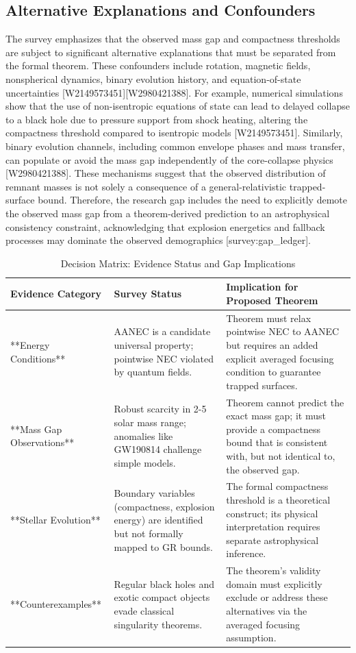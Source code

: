\documentclass[conference]{IEEEtran}
\begin{document}
\subsection{Alternative Explanations and Confounders}
The survey emphasizes that the observed mass gap and compactness thresholds are subject to significant alternative explanations that must be separated from the formal theorem. These confounders include rotation, magnetic fields, nonspherical dynamics, binary evolution history, and equation-of-state uncertainties [W2149573451][W2980421388]. For example, numerical simulations show that the use of non-isentropic equations of state can lead to delayed collapse to a black hole due to pressure support from shock heating, altering the compactness threshold compared to isentropic models [W2149573451]. Similarly, binary evolution channels, including common envelope phases and mass transfer, can populate or avoid the mass gap independently of the core-collapse physics [W2980421388]. These mechanisms suggest that the observed distribution of remnant masses is not solely a consequence of a general-relativistic trapped-surface bound. Therefore, the research gap includes the need to explicitly demote the observed mass gap from a theorem-derived prediction to an astrophysical consistency constraint, acknowledging that explosion energetics and fallback processes may dominate the observed demographics [survey:gap\_ledger].~\cite{cite_7a44e6730c44cb39}

\begin{table}[htbp]
\centering
\footnotesize
\setlength{\tabcolsep}{3pt}
\renewcommand{\arraystretch}{1.12}
\caption{Decision Matrix: Evidence Status and Gap Implications}
\label{tab:survey-and-research-gap-gap-04}
\begin{tabular}{|p{}|p{}|p{}|}
\hline
Evidence Category & Survey Status & Implication for Proposed Theorem \\\hline
**Energy Conditions** & AANEC is a candidate universal property; pointwise NEC violated by quantum fields. & Theorem must relax pointwise NEC to AANEC but requires an added explicit averaged focusing condition to guarantee trapped surfaces. \\\hline
**Mass Gap Observations** & Robust scarcity in 2-5 solar mass range; anomalies like GW190814 challenge simple models. & Theorem cannot predict the exact mass gap; it must provide a compactness bound that is consistent with, but not identical to, the observed gap. \\\hline
**Stellar Evolution** & Boundary variables (compactness, explosion energy) are identified but not formally mapped to GR bounds. & The formal compactness threshold is a theoretical construct; its physical interpretation requires separate astrophysical inference. \\\hline
**Counterexamples** & Regular black holes and exotic compact objects evade classical singularity theorems. & The theorem's validity domain must explicitly exclude or address these alternatives via the averaged focusing assumption. \\\hline
\end{tabular}
\end{table}
\end{document}
